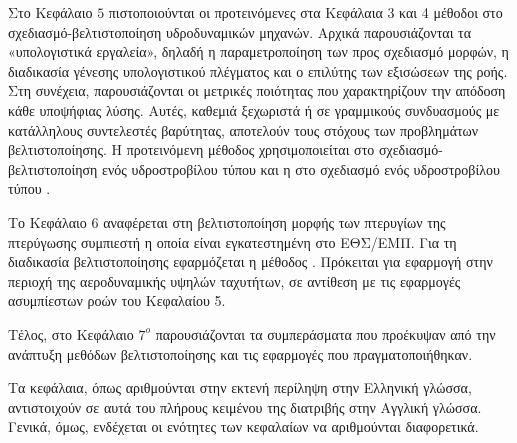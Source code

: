 Στο Κεφάλαιο $5$ πιστοποιούνται οι προτεινόμενες στα Κεφάλαια 3 και 4 μέθοδοι στο σχεδιασμό-βελτιστοποίηση υδροδυναμικών μηχανών.  Αρχικά παρουσιάζονται τα «υπολογιστικά εργαλεία»,  δηλαδή η παραμετροποίηση των προς σχεδιασμό μορφών, η διαδικασία γένεσης υπολογιστικού πλέγματος και ο επιλύτης των εξισώσεων της ροής.  Στη συνέχεια, παρουσιάζονται οι μετρικές ποιότητας που χαρακτηρίζουν την απόδοση κάθε υποψήφιας λύσης. Αυτές, καθεμιά ξεχωριστά ή σε γραμμικούς συνδυασμούς με κατάλληλους συντελεστές βαρύτητας, αποτελούν τους στόχους των προβλημάτων βελτιστοποίησης.    Η προτεινόμενη μέθοδος  χρησιμοποιείται στο σχεδιασμό-βελτιστοποίηση ενός υδροστροβίλου τύπου  και η  στο σχεδιασμό ενός υδροστροβίλου τύπου .   


Το Κεφάλαιο $6$ αναφέρεται στη βελτιστοποίηση μορφής των πτερυγίων της πτερύγωσης συμπιεστή η οποία είναι εγκατεστημένη στο ΕΘΣ/ΕΜΠ. Για τη διαδικασία βελτιστοποίησης εφαρμόζεται η μέθοδος . Πρόκειται για εφαρμογή στην περιοχή της αεροδυναμικής υψηλών ταχυτήτων, σε αντίθεση με τις εφαρμογές ασυμπίεστων ροών του Κεφαλαίου 5. 

Τέλος, στο Κεφάλαιο $7^o$ παρουσιάζονται τα συμπεράσματα που προέκυψαν από την ανάπτυξη μεθόδων βελτιστοποίησης και τις εφαρμογές που πραγματοποιήθηκαν.

Τα κεφάλαια, όπως αριθμούνται στην εκτενή περίληψη στην Ελληνική γλώσσα, αντιστοιχούν σε αυτά του πλήρους κειμένου της διατριβής στην Αγγλική γλώσσα. Γενικά, όμως, ενδέχεται οι ενότητες των κεφαλαίων να αριθμούνται διαφορετικά. 

